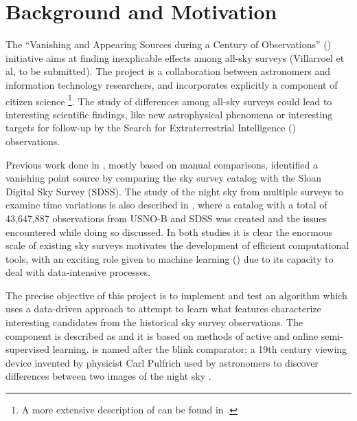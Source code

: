 \section{Background and Motivation} \label{sect:intro:background}

The ``Vanishing and Appearing Sources during a Century of Observations'' (\vasco) initiative aims at finding inexplicable effects among all-sky surveys \cite{article:our-sky} (Villarroel et al, to be submitted). The \vasco project is a collaboration between astronomers and information technology researchers, and incorporates explicitly a component of citizen science \footnote{A more extensive description of \vasco can be found in \cite{web:vasco}.}. The study of differences among all-sky surveys could lead to interesting scientific findings, like new astrophysical phenomena or interesting targets for follow-up by the Search for Extraterrestrial Intelligence (\seti) observations. \newline

Previous work done in \cite{article:our-sky}, mostly based on manual comparisons, identified a vanishing point source by comparing the \usno sky survey catalog with the Sloan Digital Sky Survey (SDSS). The study of the night sky from multiple surveys to examine time variations is also described in \cite{article:two-epoch-catalog}, where a catalog with a total of 43,647,887 observations from USNO-B and SDSS was created and the issues encountered while doing so discussed. In both studies it is clear the enormous scale of existing sky surveys motivates the development of efficient computational tools, with an exciting role given to machine learning (\ml) due to its capacity to deal with data-intensive processes. \newline

The precise objective of this project is to implement and test an \ml algorithm which uses a data-driven approach to attempt to learn what features characterize interesting candidates from the historical sky survey observations. The \ml component is described as \mlblink and it is based on methods of active and online semi-supervised learning. \mlblink is named after the blink comparator; a 19th century viewing device invented by physicist Carl Pulfrich used by astronomers to discover differences between two images of the night sky \cite{article:blink-comparator}. \newline

